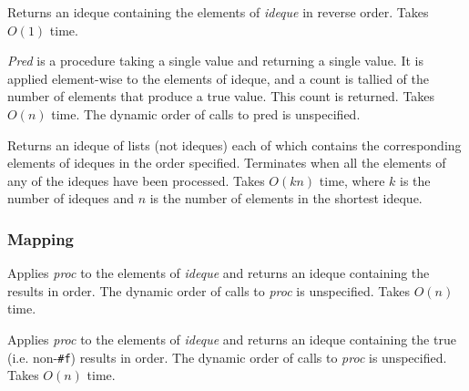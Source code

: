 \begin{entry}{%
  }

  Returns an ideque containing the elements of \emph{ideque} in
  reverse order. Takes $O(1)$ time.
\end{entry}

\begin{entry}{%
  }

  \emph{Pred} is a procedure taking a single value and returning a
  single value. It is applied element-wise to the elements of ideque,
  and a count is tallied of the number of elements that produce a true
  value. This count is returned. Takes $O(n)$ time. The dynamic order of
  calls to pred is unspecified.
\end{entry}

\begin{entry}{%
  }

  Returns an ideque of lists (not ideques) each of which contains the
  corresponding elements of ideques in the order specified. Terminates
  when all the elements of any of the ideques have been
  processed. Takes $O(kn)$ time, where $k$ is the number of ideques
  and $n$ is the number of elements in the shortest ideque.
\end{entry}

\subsubsection{Mapping}

\begin{entry}{%
  }

  Applies \emph{proc} to the elements of \emph{ideque} and returns an
  ideque containing the results in order. The dynamic order of calls
  to \emph{proc} is unspecified. Takes $O(n)$ time.
\end{entry}

\begin{entry}{%
  }

  Applies \emph{proc} to the elements of \emph{ideque} and returns an
  ideque containing the true (i.e. non-\texttt{\#f}) results in
  order. The dynamic order of calls to \emph{proc} is
  unspecified. Takes $O(n)$ time.
\end{entry}


